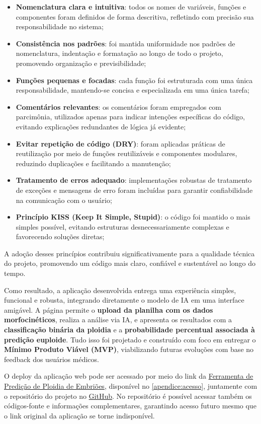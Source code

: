 \begin{itemize}
    \item \textbf{Nomenclatura clara e intuitiva}: todos os nomes de variáveis, funções e componentes foram definidos de forma descritiva, refletindo com precisão sua responsabilidade no sistema;

    \item \textbf{Consistência nos padrões}: foi mantida uniformidade nos padrões de nomenclatura, indentação e formatação ao longo de todo o projeto, promovendo organização e previsibilidade;

    \item \textbf{Funções pequenas e focadas}: cada função foi estruturada com uma única responsabilidade, mantendo-se concisa e especializada em uma única tarefa;

    \item \textbf{Comentários relevantes}: os comentários foram empregados com parcimônia, utilizados apenas para indicar intenções específicas do código, evitando explicações redundantes de lógica já evidente;

    \item \textbf{Evitar repetição de código (DRY)}: foram aplicadas práticas de reutilização por meio de funções reutilizáveis e componentes modulares, reduzindo duplicações e facilitando a manutenção;

    \item \textbf{Tratamento de erros adequado}: implementações robustas de tratamento de exceções e mensagens de erro foram incluídas para garantir confiabilidade na comunicação com o usuário;

    \item \textbf{Princípio KISS (Keep It Simple, Stupid)}: o código foi mantido o mais simples possível, evitando estruturas desnecessariamente complexas e favorecendo soluções diretas;
\end{itemize}

A adoção desses princípios contribuiu significativamente para a qualidade técnica do projeto, promovendo um código mais claro, confiável e sustentável ao longo do tempo.

Como resultado, a aplicação desenvolvida entrega uma experiência simples, funcional e robusta, integrando diretamente o modelo de IA em uma interface amigável. A página permite o \textbf{upload da planilha com os dados morfocinéticos}, realiza a análise via IA, e apresenta os resultados com a \textbf{classificação binária da ploidia} e a \textbf{probabilidade percentual associada à predição euploide}. Tudo isso foi projetado e construído com foco em entregar o \textbf{Mínimo Produto Viável (MVP)}, viabilizando futuras evoluções com base no feedback dos usuários médicos.

O deploy da aplicação web pode ser acessado por meio do link da \href{https://embryo-predictor.vercel.app}{Ferramenta de Predição de Ploidia de Embriões}, disponível no \autoref{apendice:acesso}, juntamente com o repositório do projeto no \href{https://github.com/sabrinaberno/embryo-predictor}{GitHub}. No repositório é possível acessar também os códigos-fonte e informações complementares, garantindo acesso futuro mesmo que o link original da aplicação se torne indisponível.